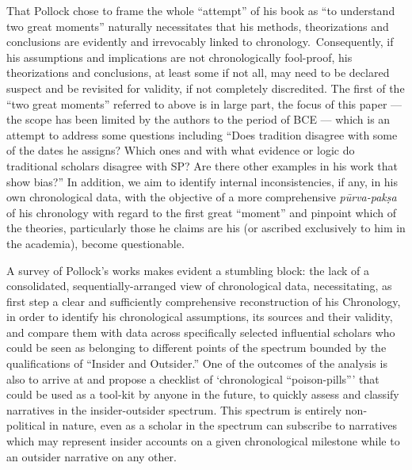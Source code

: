 That Pollock chose to frame the whole “attempt” of his book as “to understand two great moments” naturally necessitates that his methods, theorizations and conclusions are evidently and irrevocably linked to chronology.~Consequently, if his assumptions and implications are not chronologically fool-proof, his theorizations and conclusions, at least some if not all, may need to be declared suspect and be revisited for validity, if not completely discredited. The first of the “two great moments” referred to above is in large part, the focus of this paper — the scope has been limited by the authors to the period of BCE — which is an attempt to address some questions including “Does tradition disagree with some of the dates he assigns? Which ones and with what evidence or logic do traditional scholars disagree with SP? Are there other examples in his work that show bias?” In addition, we aim to identify internal inconsistencies, if any, in his own chronological data, with the objective of a more comprehensive \textit{pūrva-pakṣa} of his chronology with regard to the first great “moment” and pinpoint which of the theories, particularly those he claims are his (or ascribed exclusively to him in the academia), become questionable.

\bigskip

A survey of Pollock’s works makes evident a stumbling block: the lack of a consolidated, sequentially-arranged view of chronological data, necessitating, as first step a clear and sufficiently comprehensive reconstruction of his Chronology, in order to identify his chronological assumptions, its sources and their validity, and compare them with data across specifically selected influential scholars who could be seen as belonging to different points of the spectrum bounded by the qualifications of “Insider and Outsider.” One of the outcomes of the analysis is also to arrive at and propose a checklist of ‘chronological “poison-pills”’ that could be used as a tool-kit by anyone in the future, to quickly assess and classify narratives in the insider-outsider spectrum. This spectrum is entirely non-political in nature, even as a scholar in the spectrum can subscribe to narratives which may represent insider accounts on a given chronological milestone while to an outsider narrative on any other.

